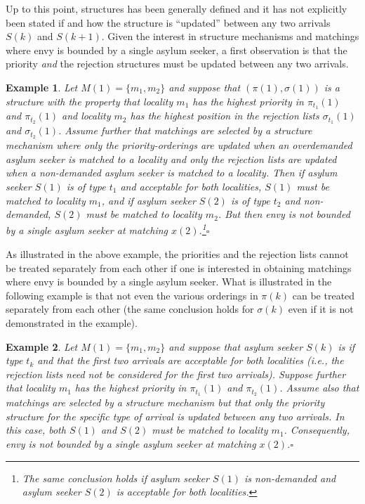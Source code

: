 \documentclass[12pt,fleqn]{article}
\newtheorem{example}{Example}
\begin{document}
\noindent Up to this point, structures has been generally defined and it has not explicitly been stated if and how the structure is ``updated'' between any two arrivals $S(k)$ and $S(k+1)$. Given the interest in structure mechanisms and matchings where envy is bounded by a single asylum seeker, a first observation is that the priority \emph{and} the rejection structures must be updated between any two arrivals.
\begin{example}\rm
Let $M(1)=\{m_1,m_2\}$ and suppose that $(\pi(1),\sigma(1))$ is a structure with the property that locality $m_1$ has the highest priority in $\pi_{t_1}(1)$ and $\pi_{t_2}(1)$ and locality $m_2$ has the highest position in the rejection lists $\sigma_{t_1}(1)$ and $\sigma_{t_2}(1)$. Assume further that matchings are selected by a structure mechanism where \emph{only} the priority-orderings are updated when an overdemanded asylum seeker is matched to a locality and \emph{only} the rejection lists are updated when a non-demanded asylum seeker is matched to a locality. Then if asylum seeker $S(1)$ is of type $t_1$ and acceptable for both localities, $S(1)$ must be matched to locality $m_1$, and if asylum seeker $S(2)$ is of type $t_2$ and non-demanded, $S(2)$ must be matched to locality $m_2$. But then envy is not bounded by a single asylum seeker at matching $x(2)$.\footnote{The same conclusion holds if asylum seeker $S(1)$ is non-demanded and asylum seeker $S(2)$ is acceptable for both localities.}\hfill$\square$
\end{example}

\noindent As illustrated in the above example, the priorities and the rejection lists cannot be treated separately from each other if one is interested in obtaining matchings where envy is bounded by a single asylum seeker. What is illustrated in the following example is that not even the various orderings in $\pi(k)$ can be treated separately from each other (the same conclusion holds for $\sigma(k)$ even if it is not demonstrated in the example).

\begin{example}\rm
Let $M(1)=\{m_1,m_2\}$ and suppose that asylum seeker $S(k)$ is if type $t_k$ and that the first two arrivals are acceptable for both localities (i.e., the rejection lists need not be considered for the first two arrivals). Suppose further that locality $m_1$ has the highest priority in $\pi_{t_1}(1)$ and $\pi_{t_2}(1)$. Assume also that matchings are selected by a structure mechanism but that \emph{only} the priority structure for the specific type of arrival is updated between any two arrivals. In this case, both $S(1)$ and $S(2)$ must be matched to locality $m_1$. Consequently, envy is not bounded by a single asylum seeker at matching $x(2)$.\hfill $\square$
\end{example}
\end{document}
